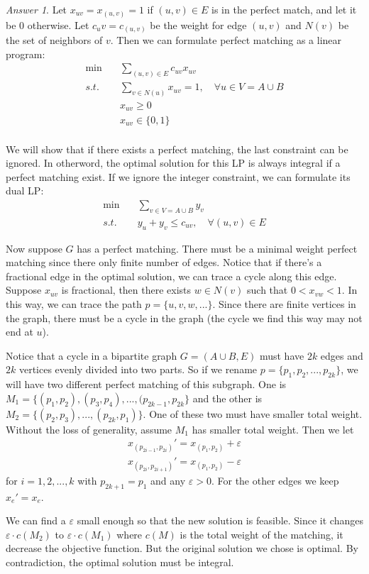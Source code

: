 \documentclass[10pt,a4paper]{article}
\theoremstyle{plain}
\theoremstyle{definition}
\theoremstyle{remark}
\newtheorem*{answer*}{Answer}
\newcommand{\<}{\langle}
\renewcommand{\>}{\rangle}
\begin{document}
\begin{answer*} \hfill

Let $x_{uv} = x_{(u,v)} = 1$ if $(u,v)\in E$ is in the perfect match, and let it be $0$ otherwise. Let $c_uv = c_{(u,v)}$ be the weight for edge $(u,v)$ and $N(v)$ be the set of neighbors of $v$. Then we can formulate perfect matching as a linear program:
\begin{align*}
\min \quad & \sum_{(u,v)\in E} c_{uv}x_{uv} \\
s.t. \quad & \sum_{v\in N(u)} x_{uv} = 1, \quad \forall u\in V=A\cup B \\
& x_{uv} \geq 0 \\
& x_{uv} \in \{0,1\} \\
\end{align*}

We will show that if there exists a perfect matching, the last constraint can be ignored. In otherword, the optimal solution for this LP is always integral if a perfect matching exist. If we ignore the integer constraint, we can formulate its dual LP:
\begin{align*}
\min \quad & \sum_{v\in V=A\cup B} y_v \\
s.t. \quad & y_u+y_v \leq c_{uv},\quad\forall (u,v)\in E
\end{align*}

Now suppose $G$ has a perfect matching. There must be a minimal weight perfect matching since there only finite number of edges. Notice that if there's a fractional edge in the optimal solution, we can trace a cycle along this edge. Suppose $x_{uv}$ is fractional, then there exists $w\in N(v)$ such that $0 < x_{vw} < 1$. In this way, we can trace the path $p = \{u,v,w,...\}$. Since there are finite vertices in the graph, there must be a cycle in the graph (the cycle we find this way may not end at $u$).

Notice that a cycle in a bipartite graph $G = (A\cup B, E)$ must have $2k$ edges and $2k$ vertices evenly divided into two parts. So if we rename $p = \{p_1,p_2,...,p_{2k}\}$, we will have two different perfect matching of this subgraph. One is $M_1 = \{(p_1,p_2), (p_3,p_4),...,(p_{2k-1},p_{2k}\}$ and the other is $M_2 = \{(p_2,p_3),...,(p_{2k},p_1)\}$. One of these two must have smaller total weight. Without the loss of generality, assume $M_1$ has smaller total weight. Then we let
\begin{align*}
x_{(p_{2i-1},p_{2i})}' = x_{(p_1,p_2)}+\varepsilon \\
x_{(p_{2i},p_{2i+1})}' = x_{(p_1,p_2)}-\varepsilon
\end{align*}
for $i = 1,2,...,k$ with $p_{2k+1} = p_1$ and any $\varepsilon>0$. For the other edges we keep $x_e' = x_e$.

We can find a $\varepsilon$ small enough so that the new solution is feasible. Since it changes $\varepsilon\cdot c(M_2)$ to $\varepsilon\cdot c(M_1)$ where $c(M)$ is the total weight of the matching, it decrease the objective function. But the original solution we chose is optimal. By contradiction, the optimal solution must be integral.
\end{answer*}
\end{document}

